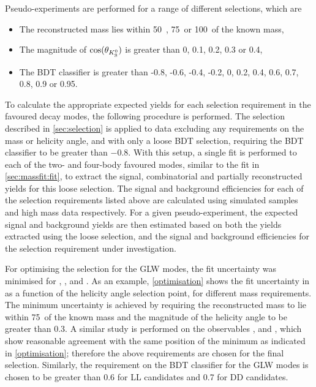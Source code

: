 Pseudo-experiments are performed for a range of different selections, which are
\begin{itemize}
\item{The reconstructed \Kstarm mass lies within 50~\mevcc, 75~\mevcc or 100~\mevcc of the known \Kstarm mass,}
\item{The magnitude of $\cos(\theta_{{{K}^0_{\mathrm{ \scriptscriptstyle S}}}})$ is greater than 0, 0.1, 0.2, 0.3 or 0.4,}
\item{The BDT classifier is greater than -0.8, -0.6, -0.4, -0.2, 0, 0.2, 0.4, 0.6, 0.7, 0.8, 0.9 or 0.95.}
\end{itemize}
To calculate the appropriate expected yields for each selection requirement in the favoured \Dz decay modes, the following procedure is performed. The selection described in \sect\ref{sec:selection} is applied to data excluding any requirements on the \Kstarm mass or \KS helicity angle, and with only a loose BDT selection, requiring the BDT classifier to be greater than $-0.8$. With this setup, a single fit is performed to each of the two- and four-body favoured modes, similar to the fit in \sect\ref{sec:massfit:fit}, to extract the signal, combinatorial and partially reconstructed yields for this loose selection. The signal and background efficiencies for each of the selection requirements listed above are calculated using simulated samples and high \Bm mass data respectively. For a given pseudo-experiment, the expected signal and background yields are then estimated based on both the yields extracted using the loose selection, and the signal and background efficiencies for the selection requirement under investigation.

For optimising the selection for the GLW modes, the fit uncertainty was minimised for \Akk, \Rkk, \Apipi and \Rpipi. As an example, \fig\ref{optimisation} shows the fit uncertainty in \Rkk as a function of the \KS helicity angle selection point, for different \Kstarm mass requirements. The minimum uncertainty is achieved by requiring the reconstructed \Kstarm mass to lie within 75~\mevcc of the known \Kstarm mass and the magnitude of the \KS helicity angle to be greater than 0.3. A similar study is performed on the \CP observables \Akk, \Apipi and \Rpipi, which show reasonable agreement with the same position of the minimum as indicated in \fig\ref{optimisation}; therefore the above \Kstarm requirements are chosen for the final selection. Similarly, the requirement on the BDT classifier for the GLW modes is chosen to be greater than 0.6 for LL candidates and 0.7 for DD candidates. 

